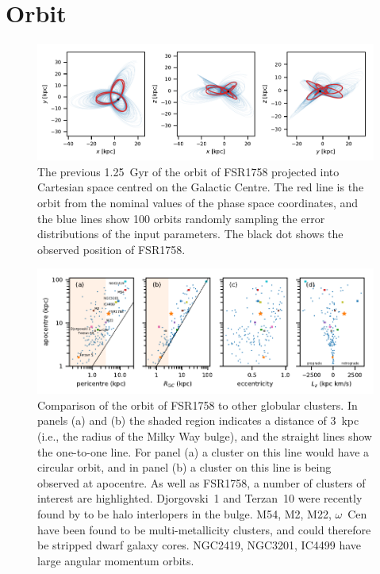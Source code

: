 \documentclass[fleqn,usenatbib]{mnras}
\begin{document}
\section{Orbit}\label{sec:orbit}

\begin{figure}
	\includegraphics[width=\textwidth]{figures/orbit.pdf}
    \caption{The previous 1.25~Gyr of the orbit of FSR1758 projected into Cartesian space centred on the Galactic Centre. The red line is the orbit from the nominal values of the phase space coordinates, and the blue lines show 100 orbits randomly sampling the error distributions of the input parameters. The black dot shows the observed position of FSR1758.}
    \label{fig:orbit}
\end{figure}

\begin{figure}
	\includegraphics[width=\textwidth]{figures/orbit_comparison.pdf}
    \caption{Comparison of the orbit of FSR1758 to other globular clusters. In panels (a) and (b) the shaded region indicates a distance of 3~kpc (i.e., the radius of the Milky Way bulge), and the straight lines show the one-to-one line. For panel (a) a cluster on this line would have a circular orbit, and in panel (b) a cluster on this line is being observed at apocentre. As well as FSR1758, a number of clusters of interest are highlighted. Djorgovski~1 and Terzan~10 were recently found by \citet{Ortolani2019} to be halo interlopers in the bulge. M54, M2, M22, $\omega$~Cen have been found to be multi-metallicity clusters, and could therefore be stripped dwarf galaxy cores. NGC2419, NGC3201, IC4499 have large angular momentum orbits.}
    \label{fig:orbit_comparison.pdf}
\end{figure}
\end{document}
